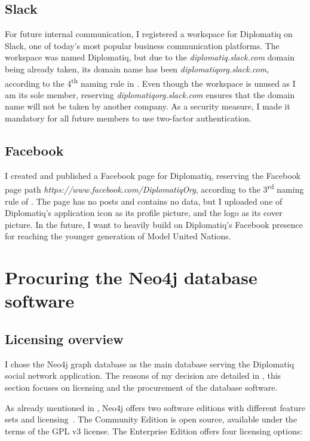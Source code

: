 \subsection{Slack}

For future internal communication, I registered a workspace for Diplomatiq on Slack, one of today's most popular business communication platforms. The workspace was named Diplomatiq, but due to the \emph{diplomatiq.slack.com} domain being already taken, its domain name has been \emph{diplomatiqorg.slack.com}, according to the 4\textsuperscript{th} naming rule in . Even though the workspace is unused as I am its sole member, reserving \emph{diplomatiqorg.slack.com} ensures that the domain name will not be taken by another company. As a security measure, I made it mandatory for all future members to use two-factor authentication.

\subsection{Facebook}

I created and published a Facebook page for Diplomatiq, reserving the Facebook page path \emph{https://www.facebook.com/DiplomatiqOrg}, according to the 3\textsuperscript{rd} naming rule of . The page has no posts and contains no data, but I uploaded one of Diplomatiq's application icon as its profile picture, and the logo as its cover picture. In the future, I want to heavily build on Diplomatiq's Facebook presence for reaching the younger generation of Model United Nations.

\section{Procuring the Neo4j database software}

\subsection{Licensing overview}

I chose the Neo4j graph database as the main database serving the Diplomatiq social network application. The reasons of my decision are detailed in , this section focuses on licensing and the procurement of the database software.

As already mentioned in , Neo4j offers two software editions with different feature sets and licensing~\cite{neo4j-licensing}. The Community Edition is open source, available under the terms of the GPL v3 license. The Enterprise Edition offers four licensing options:


